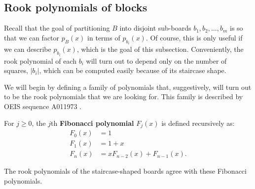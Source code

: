 

\subsection{Rook polynomials of blocks}
Recall that the goal of partitioning $B$ into disjoint sub-boards
$b_1, b_2, \dots, b_m$ is so that we can
factor $p_B(x)$ in terms of $p_{b_i}(x)$.
Of course, this is only useful if we can describe $p_{b_i}(x)$,
which is the goal of this subsection.
Conveniently, the rook polynomial of each $b_i$ will turn out to depend only on the
number of squares, $|b_i|$, which can be computed easily because of its
staircase shape.

We will begin by defining a family of polynomials that, suggestively, will turn
out to be the rook polynomials that we are looking for.
This family is described by OEIS sequence A011973 \cite{oeis}.
\begin{definition}
  For $j \geq 0$, the $j$th \textbf{Fibonacci polynomial} $F_{j}(x)$ is defined recursively as:
  \begin{align}
    F_0(x) &= 1 \\
    F_1(x) &= 1 + x \\
    F_n(x) &= xF_{n-2}(x) + F_{n-1}(x).
  \end{align}
\end{definition}

The rook polynomials of the staircase-shaped boards agree with these Fibonacci
polynomials.

